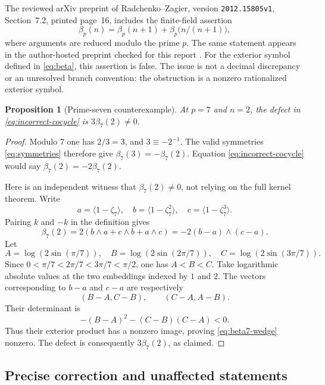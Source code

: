 \documentclass[11pt]{article}
\numberwithin{equation}{section}
\newtheorem{proposition}[theorem]{Proposition}
\theoremstyle{definition}
\theoremstyle{remark}
\newcommand{\cl}[1]{\langle #1\rangle}
\begin{document}
The reviewed arXiv preprint of Radchenko--Zagier, version
\texttt{2012.15805v1}, Section~7.2, printed page~16, includes the
finite-field assertion
\begin{equation}\label{eq:incorrect-cocycle}
 \beta_p(n)=\beta_p(n+1)+\beta_p\bigl(n/(n+1)\bigr),
\end{equation}
where arguments are reduced modulo the prime $p$. The same statement
appears in the author-hosted preprint checked for this report
\cite{RZ}. For the exterior symbol defined in \eqref{eq:beta}, this
assertion is false. The issue is not a decimal discrepancy or an
unresolved branch convention: the obstruction is a nonzero rationalized
exterior symbol.

\begin{proposition}[Prime-seven counterexample]\label{prop:counterexample}
At $p=7$ and $n=2$, the defect in \eqref{eq:incorrect-cocycle} is
$3\beta_7(2)\ne0$.
\end{proposition}
\begin{proof}
Modulo $7$ one has $2/3=3$, and $3\equiv-2^{-1}$. The valid
symmetries \eqref{eq:symmetries} therefore give
$\beta_7(3)=-\beta_7(2)$. Equation
\eqref{eq:incorrect-cocycle} would say
$\beta_7(2)=-2\beta_7(2)$.

Here is an independent witness that $\beta_7(2)\ne0$, not relying on
the full kernel theorem. Write
\[
 a=\cl{1-\zeta_7},\quad b=\cl{1-\zeta_7^2},\quad
 c=\cl{1-\zeta_7^3}.
\]
Pairing $k$ and $-k$ in the definition gives
\begin{equation}\label{eq:beta7-wedge}
 \beta_7(2)=2(b\wedge a+c\wedge b+a\wedge c)
          =-2(b-a)\wedge(c-a).
\end{equation}
Let
\[
 A=\log(2\sin(\pi/7)),\quad B=\log(2\sin(2\pi/7)),\quad
 C=\log(2\sin(3\pi/7)).
\]
Since $0<\pi/7<2\pi/7<3\pi/7<\pi/2$, one has $A<B<C$.
Take logarithmic absolute values at the two embeddings indexed by
$1$ and $2$. The vectors corresponding to $b-a$ and $c-a$ are
respectively
\[
 (B-A,C-B),\qquad(C-A,A-B).
\]
Their determinant is
\begin{equation}\label{eq:det-witness}
 -(B-A)^2-(C-B)(C-A)<0.
\end{equation}
Thus their exterior product has a nonzero image, proving
\eqref{eq:beta7-wedge} nonzero. The defect is consequently
$3\beta_7(2)$, as claimed.
\end{proof}

\subsection{Precise correction and unaffected statements}
\end{document}
